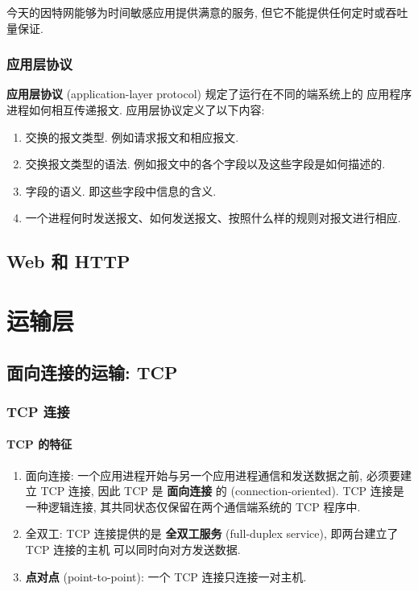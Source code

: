 \documentclass[10pt,UTF8]{book} %
\begin{document}
\vspace*{1em}
今天的因特网能够为时间敏感应用提供满意的服务, 但它不能提供任何定时或吞吐量保证.

\subsection{应用层协议}

\textbf{应用层协议} (application-layer protocol) 规定了运行在不同的端系统上的
应用程序进程如何相互传递报文. 应用层协议定义了以下内容:
\begin{enumerate}[label={${\arabic*}^\circ$}, itemsep=0pt]
    \item 交换的报文类型. 例如请求报文和相应报文.
    \item 交换报文类型的语法. 例如报文中的各个字段以及这些字段是如何描述的.
    \item 字段的语义. 即这些字段中信息的含义.
    \item 一个进程何时发送报文、如何发送报文、按照什么样的规则对报文进行相应.
\end{enumerate}

\section{Web 和 HTTP}

\chapter{运输层}

\section{面向连接的运输: TCP}

\subsection{TCP 连接}

\subsubsection{TCP 的特征}

\begin{enumerate}[label={${\arabic*}^\circ$}, itemsep=0pt]
    \item 面向连接: 一个应用进程开始与另一个应用进程通信和发送数据之前,
    必须要建立 TCP 连接, 因此 TCP 是 \textbf{面向连接} 的 (connection-oriented).
    TCP 连接是一种逻辑连接, 其共同状态仅保留在两个通信端系统的 TCP 程序中.
    \item 全双工: TCP 连接提供的是 \textbf{全双工服务} (full-duplex service), 即两台建立了 TCP 连接的主机
    可以同时向对方发送数据.
    \item \textbf{点对点} (point-to-point): 一个 TCP 连接只连接一对主机.
\end{enumerate}
\end{document}
